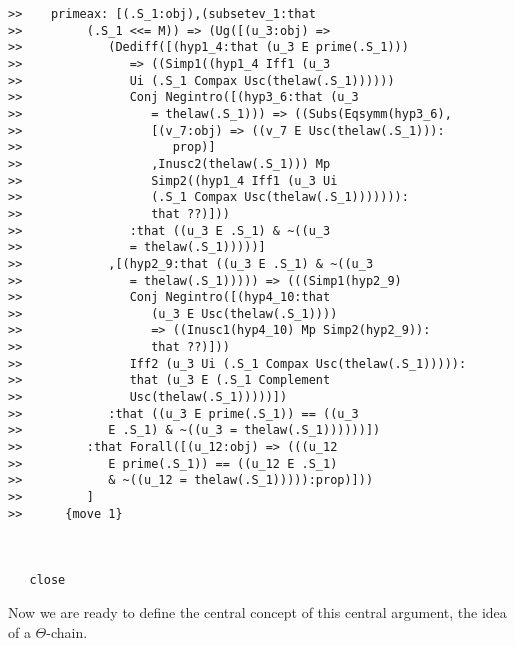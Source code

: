 \documentclass[12pt]{article}
\begin{document}
\begin{verbatim}
>>    primeax: [(.S_1:obj),(subsetev_1:that
>>         (.S_1 <<= M)) => (Ug([(u_3:obj) =>
>>            (Dediff([(hyp1_4:that (u_3 E prime(.S_1)))
>>               => ((Simp1((hyp1_4 Iff1 (u_3
>>               Ui (.S_1 Compax Usc(thelaw(.S_1))))))
>>               Conj Negintro([(hyp3_6:that (u_3
>>                  = thelaw(.S_1))) => ((Subs(Eqsymm(hyp3_6),
>>                  [(v_7:obj) => ((v_7 E Usc(thelaw(.S_1))):
>>                     prop)]
>>                  ,Inusc2(thelaw(.S_1))) Mp
>>                  Simp2((hyp1_4 Iff1 (u_3 Ui
>>                  (.S_1 Compax Usc(thelaw(.S_1))))))):
>>                  that ??)]))
>>               :that ((u_3 E .S_1) & ~((u_3
>>               = thelaw(.S_1)))))]
>>            ,[(hyp2_9:that ((u_3 E .S_1) & ~((u_3
>>               = thelaw(.S_1))))) => (((Simp1(hyp2_9)
>>               Conj Negintro([(hyp4_10:that
>>                  (u_3 E Usc(thelaw(.S_1))))
>>                  => ((Inusc1(hyp4_10) Mp Simp2(hyp2_9)):
>>                  that ??)]))
>>               Iff2 (u_3 Ui (.S_1 Compax Usc(thelaw(.S_1))))):
>>               that (u_3 E (.S_1 Complement
>>               Usc(thelaw(.S_1)))))])
>>            :that ((u_3 E prime(.S_1)) == ((u_3
>>            E .S_1) & ~((u_3 = thelaw(.S_1))))))])
>>         :that Forall([(u_12:obj) => (((u_12
>>            E prime(.S_1)) == ((u_12 E .S_1)
>>            & ~((u_12 = thelaw(.S_1))))):prop)]))
>>         ]
>>      {move 1}



   close
\end{verbatim}

Now we are ready to define the central concept of this central argument, the idea of a $\Theta$-chain.
\end{document}
